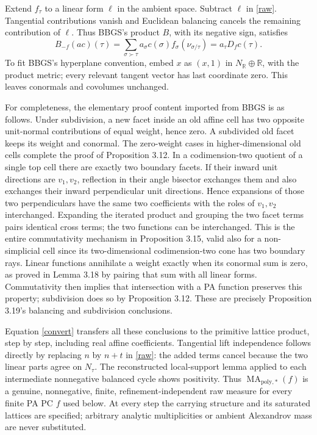 \documentclass[11pt]{article}
\newcommand{\R}{\mathbb R}
\newcommand{\MAstar}{\operatorname{MA}_{\mathrm{poly},*}}
\begin{document}
Extend \(f_\tau\) to a linear form \(\ell\) in the ambient space. Subtract
\(\ell\) in \eqref{raw}. Tangential contributions vanish and Euclidean
balancing cancels the remaining contribution of \(\ell\). Thus BBGS's
product \(B\), with its negative sign, satisfies
\begin{equation}\label{convert}
 B_{-f}(ac)(\tau)
 =\sum_{\sigma\succ\tau}a_\sigma c(\sigma)f_\sigma(\nu_{\sigma/\tau})
 =a_\tau D_f c(\tau).
\end{equation}
To fit BBGS's hyperplane convention, embed \(x\) as \((x,1)\) in
\(N_\R\oplus\R\), with the product metric; every relevant tangent vector
has last coordinate zero. This leaves conormals and covolumes unchanged.

For completeness, the elementary proof content imported from BBGS is as
follows. Under subdivision, a new facet inside an old affine cell has
two opposite unit-normal contributions of equal weight, hence zero.
A subdivided old facet keeps its weight and conormal. The zero-weight
cases in higher-dimensional old cells complete the proof of Proposition
3.12. In a codimension-two quotient of a single top cell there are exactly
two boundary facets. If their inward unit directions are \(v_1,v_2\),
reflection in their angle bisector exchanges them and also exchanges their
inward perpendicular unit directions. Hence expansions of those two
perpendiculars have the same two coefficients with the roles of \(v_1,v_2\)
interchanged. Expanding the iterated product and grouping the two
facet terms pairs identical cross terms; the two functions can be
interchanged. This is the entire commutativity mechanism in Proposition
3.15, valid also for a non-simplicial cell since its two-dimensional
codimension-two cone has two boundary rays. Linear functions annihilate
a weight exactly when its conormal sum is zero, as proved in Lemma 3.18
by pairing that sum with all linear forms. Commutativity then implies
that intersection with a PA function preserves this property; subdivision
does so by Proposition 3.12. These are precisely Proposition 3.19's
balancing and subdivision conclusions.

Equation \eqref{convert} transfers all these conclusions to the primitive
lattice product, step by step, including real affine coefficients.
Tangential lift independence follows directly by replacing \(n\) by
\(n+t\) in \eqref{raw}: the added terms cancel because the two linear
parts agree on \(N_\tau\).
The reconstructed local-support lemma applied to each intermediate nonnegative balanced
cycle shows positivity. Thus \(\MAstar(f)\) is a genuine, nonnegative,
finite, refinement-independent raw measure for every finite PA PC \(f\)
used below. At every step the carrying structure and its saturated
lattices are specified; arbitrary analytic multiplicities or ambient
Alexandrov mass are never substituted.
\end{document}
